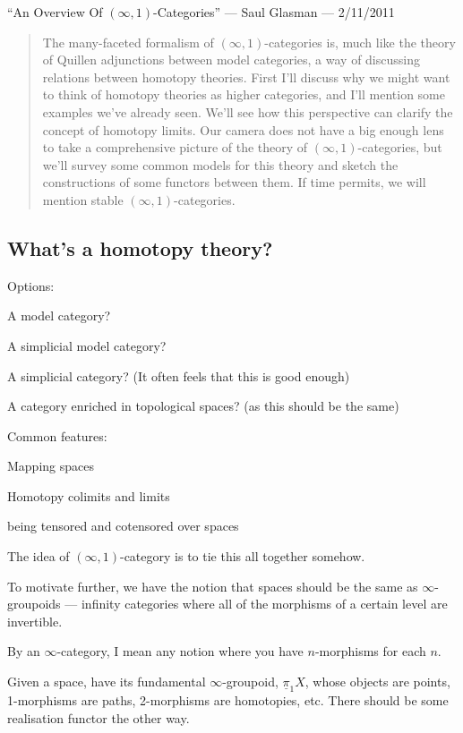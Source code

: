 \begin{RuneBabytop}
\pagebreak
\end{RuneBabytop}
\begin{SaulInftyOneCats}
\KanSemResponse
{``An Overview Of $(\infty, 1)$-Categories'' --- Saul Glasman --- 2/11/2011}
\begin{abstract}
The many-faceted formalism of $(\infty, 1)$-categories is, much like the 
theory of Quillen adjunctions between model categories, a way of 
discussing relations between homotopy theories. First I'll discuss why 
we might want to think of homotopy theories as higher categories, and 
I'll mention some examples we've already seen. We'll see how this 
perspective can clarify the concept of homotopy limits. Our camera does 
not have a big enough lens to take a comprehensive picture of the theory 
of $(\infty, 1)$-categories, but we'll survey some common models for this 
theory and sketch the constructions of some functors between them. If 
time permits, we will mention stable $(\infty, 1)$-categories.
\end{abstract}
\subsection*{What's a homotopy theory?}
Options:
\begin{itemise}
\item A model category?
\item A simplicial model category?
\item A simplicial category? (It often feels that this is good enough)
\item A category enriched in topological spaces? (as this should be the same)
\end{itemise}
Common features:
\begin{itemise}
\item Mapping spaces
\item Homotopy colimits and limits
\item being tensored and cotensored over spaces
\end{itemise}
The idea of $(\infty,1)$-category is to tie this all together somehow.

To motivate further, we have the notion that spaces should be the same as $\infty$-groupoids --- infinity categories where all of the morphisms of a certain level are invertible.

By an $\infty$-category, I mean any notion where you have $n$-morphisms for each $n$.

Given a space, have its fundamental $\infty$-groupoid, $\underline\pi_1{X}$, whose objects are points, 1-morphisms are paths, 2-morphisms are homotopies, etc. There should be some realisation functor the other way.


\end{SaulInftyOneCats}
